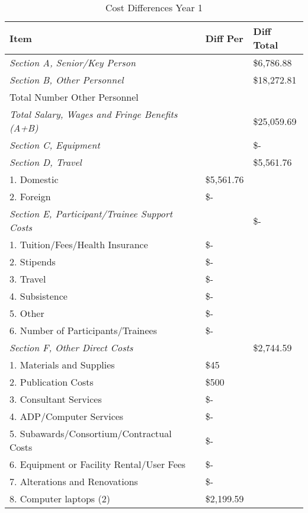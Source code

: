\documentclass[12pt]{article}
\begin{document}
\begin{table}
\begin{center}
\caption{Cost Differences Year 1}
\begin{tabular}{ | l | l | l | }
\hline
	\textbf{Item} & \textbf{Diff Per} & \textbf{Diff Total} \\ \hline
	\textit{Section A, Senior/Key Person} &  & \$6,786.88 \\ \hline
	\textit{Section B, Other Personnel} &  & \$18,272.81 \\ \hline
	Total Number Other Personnel &  & \  \\ \hline
	\textit{Total Salary, Wages and Fringe Benefits (A+B)} &  & \$25,059.69 \\ \hline
	\textit{Section C, Equipment} &  &  \$-    \\ \hline
	\textit{Section D, Travel} &  & \$5,561.76 \\ \hline
	1.  Domestic & \$5,561.76 & \  \\ \hline
	2.  Foreign &  \$-    & \  \\ \hline
	\textit{Section E, Participant/Trainee Support Costs} & \ &  \$-      \\ \hline
	1.  Tuition/Fees/Health Insurance &  \$-    & \  \\ \hline
	2.  Stipends &  \$-    & \  \\ \hline
	3.  Travel &  \$-    & \  \\ \hline
	4.  Subsistence &  \$-    & \  \\ \hline
	5.  Other &  \$-    & \  \\ \hline
	6.  Number of Participants/Trainees &  \$-    & \  \\ \hline
	\textit{Section F, Other Direct Costs} &  & \$2,744.59 \\ \hline
	1.  Materials and Supplies & \$45 & \  \\ \hline
	2.  Publication Costs & \$500 & \  \\ \hline
	3.  Consultant Services &  \$-    & \  \\ \hline
	4.  ADP/Computer Services &  \$-    & \  \\ \hline
	5.  Subawards/Consortium/Contractual Costs &  \$-    & \  \\ \hline
	6.  Equipment or Facility Rental/User Fees &  \$-    & \  \\ \hline
	7.  Alterations and Renovations &  \$-    & \  \\ \hline
	8.  Computer laptops (2) & \$2,199.59 & \  \\ \hline

\end{tabular}
\end{center}
\end{table}
\end{document}
